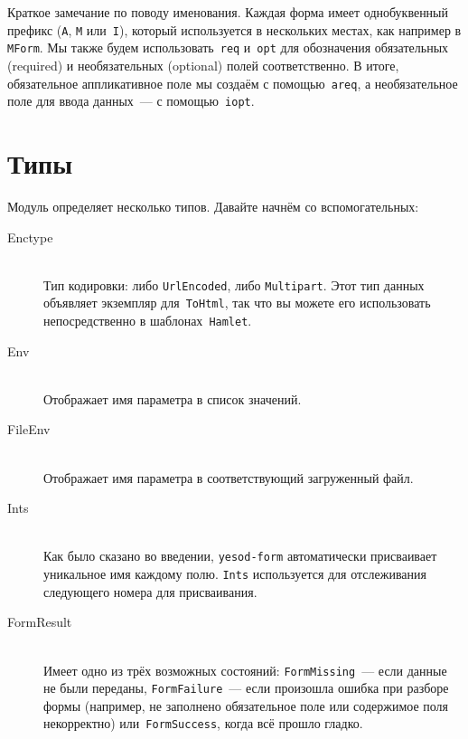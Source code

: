 Краткое замечание по поводу именования. Каждая форма имеет однобуквенный
префикс (\texttt{A}, \texttt{M} или~\texttt{I}), который используется в
нескольких местах, как например в \lstinline'MForm'. Мы также будем
использовать~\lstinline'req' и~\lstinline'opt' для обозначения обязательных
(required) и необязательных (optional) полей соответственно. В итоге,
обязательное аппликативное поле мы создаём с помощью~\lstinline'areq', а
необязательное поле для ввода данных~--- с помощью~\lstinline'iopt'.

\section{Типы}
Модуль
определяет несколько типов. Давайте начнём со вспомогательных:

\begin{description}
    \item[Enctype] \hfill \\
        Тип кодировки: либо \lstinline'UrlEncoded', либо
        \lstinline'Multipart'. Этот тип данных объявляет экземпляр
        для~\lstinline'ToHtml', так что вы можете его использовать
        непосредственно в шаблонах~\texttt{Hamlet}.

    \item[Env] \hfill \\
        Отображает имя параметра в список значений.

    \item[FileEnv] \hfill \\
        Отображает имя параметра в соответствующий загруженный файл.

    \item[Ints] \hfill \\
        Как было сказано во введении, \texttt{yesod-form} автоматически
        присваивает уникальное имя каждому полю. \lstinline'Ints' используется
        для отслеживания следующего номера для присваивания.

    \item[FormResult] \hfill \\
        Имеет одно из трёх возможных состояний: \lstinline'FormMissing'~---
        если данные не были переданы, \lstinline'FormFailure'~--- если
        произошла ошибка при разборе формы (например, не заполнено
        обязательное поле или содержимое поля некорректно)
        или~\lstinline'FormSuccess', когда всё прошло гладко.
\end{description}

